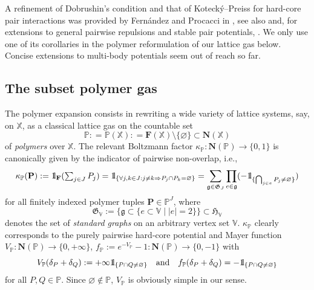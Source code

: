 \documentclass[reqno, 11pt]{amsart}
\theoremstyle{definition}
\renewcommand{\P}{\mathbb{P}}
\newcommand{\X}{\mathbb X}
\newcommand{\V}{\mathbb V}
\def\1{{\mathchoice {1\mskip-4mu\mathrm l}      
{1\mskip-4mu\mathrm l}
{1\mskip-4.5mu\mathrm l} {1\mskip-5mu\mathrm l}}}
\begin{document}
A refinement of Dobrushin's condition and that of Koteck{\'y}--Preiss for hard-core pair interactions was provided by Fern{\'a}ndez and Procacci in \cite{ref:fernandez-procacci}, see also \cite{ref:bissacot-fernandez-procacci} and, for extensions to general pairwise repulsions and stable pair potentials, \cite{ref:faris, ref:jansen-cluster, ref:jansen-kolesnikov}. 
We only use one of its corollaries in the polymer reformulation of our lattice gas below. 
Concise extensions to multi-body potentials seem out of reach so far.

\subsection{The subset polymer gas}

The polymer expansion consists in rewriting a wide variety of lattice systems, say, on $\X$, as a classical lattice gas on the countable set
\[
	\P : = \P(\X) : = \mathbf F(\X) \setminus \{\varnothing\} \subset \mathbf N(\X)
\]
of \emph{polymers} over $\X$. 
The relevant Boltzmann factor $\kappa_\P : \mathbf N(\P) \to \{0, 1\}$ is canonically given by the indicator of pairwise non-overlap, i.e.,
\[
	\kappa_\P (\mathbf P) : = \1_\mathbf F({\textstyle \sum_{j \in J} P_j}) = \1_{\{\forall j, k \in J : j \neq k \Rightarrow P_j \cap P_k = \varnothing\}} = \sum_{\mathfrak g \in \mathfrak G_J} \prod_{e \in \mathfrak g} (-\1_{\{\bigcap_{j\in e} P_j \neq \varnothing\}})
\]
for all finitely indexed polymer tuples $\mathbf P \in \P^J$, where
\[
	\mathfrak G_\V := \{\mathfrak g \subset \{e \subset \V \mid |e| = 2\}\} \subset \mathfrak H_\V
\]
denotes the set of \emph{standard graphs} on an arbitrary vertex set $\V$. 
$\kappa_\P$ clearly corresponds to the purely pairwise hard-core potential and Mayer function $V_\P : \mathbf N(\P) \to \{0,+\infty\}$, $f_\P := e^{-V_\P}-1 : \mathbf N(\P) \to \{0, -1\}$ with
\[
	V_\P(\delta_P + \delta_Q) := +\infty \1_{\{P \cap Q \neq \varnothing\}} \quad \text{and} \quad f_\P(\delta_P + \delta_Q) = -\1_{\{P \cap Q \neq \varnothing\}}
\]
for all $P, Q \in \P$. 
Since $\varnothing \notin \P$, $V_\P$ is obviously simple in our sense.
\end{document}
